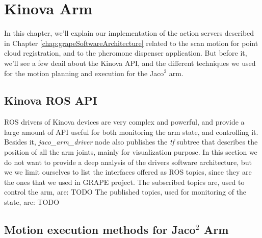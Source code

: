 
\chapter{Kinova Arm} \label{chap:kinovaArmChapter}

In this chapter, we'll explain our implementation of the action servers described in Chapter \ref{chap:grapeSoftwareArchitecture} related to the scan motion for point cloud registration, and to the pheromone dispenser application.
But before it, we'll see a few deail about the Kinova \ac{API}, and the different techniques we used for the motion planning and execution for the Jaco$^2$ arm.

\section{Kinova ROS API}
\ac{ROS} drivers of Kinova devices are very complex and powerful, and provide a large amount of \ac{API} useful for both monitoring the arm state, and controlling it. Besides it, \textit{jaco\_arm\_driver} node also publishes the \textit{tf} subtree that describes the position of all the arm joints, mainly for visualization purpose.
In this section we do not want to provide a deep analysis of the drivers software architecture, but we we limit ourselves to list the interfaces offered as \ac{ROS} topics, since they are the ones that we used in \ac{GRAPE} project. The subscribed topics are, used to control the arm, are: TODO
The published topics, used for monitoring of the state, are: TODO



\section{Motion execution methods for Jaco$^2$ Arm}

